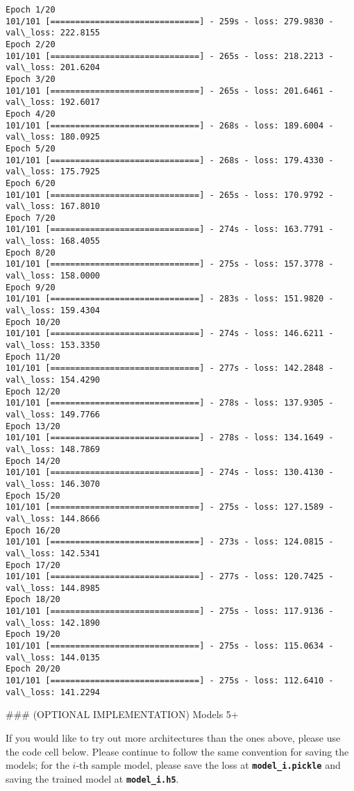 \documentclass[11pt]{article}
\begin{document}
    \begin{Verbatim}[commandchars=\\\{\}]
Epoch 1/20
101/101 [==============================] - 259s - loss: 279.9830 - val\_loss: 222.8155
Epoch 2/20
101/101 [==============================] - 265s - loss: 218.2213 - val\_loss: 201.6204
Epoch 3/20
101/101 [==============================] - 265s - loss: 201.6461 - val\_loss: 192.6017
Epoch 4/20
101/101 [==============================] - 268s - loss: 189.6004 - val\_loss: 180.0925
Epoch 5/20
101/101 [==============================] - 268s - loss: 179.4330 - val\_loss: 175.7925
Epoch 6/20
101/101 [==============================] - 265s - loss: 170.9792 - val\_loss: 167.8010
Epoch 7/20
101/101 [==============================] - 274s - loss: 163.7791 - val\_loss: 168.4055
Epoch 8/20
101/101 [==============================] - 275s - loss: 157.3778 - val\_loss: 158.0000
Epoch 9/20
101/101 [==============================] - 283s - loss: 151.9820 - val\_loss: 159.4304
Epoch 10/20
101/101 [==============================] - 274s - loss: 146.6211 - val\_loss: 153.3350
Epoch 11/20
101/101 [==============================] - 277s - loss: 142.2848 - val\_loss: 154.4290
Epoch 12/20
101/101 [==============================] - 278s - loss: 137.9305 - val\_loss: 149.7766
Epoch 13/20
101/101 [==============================] - 278s - loss: 134.1649 - val\_loss: 148.7869
Epoch 14/20
101/101 [==============================] - 274s - loss: 130.4130 - val\_loss: 146.3070
Epoch 15/20
101/101 [==============================] - 275s - loss: 127.1589 - val\_loss: 144.8666
Epoch 16/20
101/101 [==============================] - 273s - loss: 124.0815 - val\_loss: 142.5341
Epoch 17/20
101/101 [==============================] - 277s - loss: 120.7425 - val\_loss: 144.8985
Epoch 18/20
101/101 [==============================] - 275s - loss: 117.9136 - val\_loss: 142.1890
Epoch 19/20
101/101 [==============================] - 275s - loss: 115.0634 - val\_loss: 144.0135
Epoch 20/20
101/101 [==============================] - 275s - loss: 112.6410 - val\_loss: 141.2294

    \end{Verbatim}

     \#\#\# (OPTIONAL IMPLEMENTATION) Models 5+

If you would like to try out more architectures than the ones above,
please use the code cell below. Please continue to follow the same
convention for saving the models; for the \(i\)-th sample model, please
save the loss at \textbf{\texttt{model\_i.pickle}} and saving the
trained model at \textbf{\texttt{model\_i.h5}}.
\end{document}
